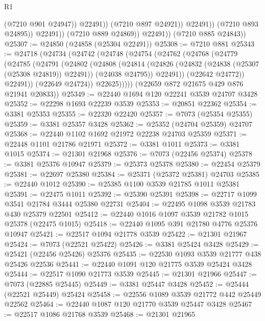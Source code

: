 \begin{lexlean}{R1}
\begin{coremodule}
                              (@7210 @901 @24947))
                            @22491))
                        (@7210 @897 @24921))
                      @22491))
                  (@7210 @893 @24895))
                @22491))
            (@7210 @889 @24869))
          @22491))
      (@7210 @885 @24843))
@25307 := @24850 (@24858 (@25304 @22491))
@25308 := @7210 @881
@25343 := @24718
    (@24734
      (@24742
        (@24748
          (@24754
            (@24762
              (@24768
                (@24779
                  (@24785
                    (@24791
                      (@24802
                        (@24808
                          (@24814
                            (@24826
                              (@24832 (@24838 (@25307 (@25308 @24819)) @22491))
                              (@24038 @24795))
                            @22491))
                        (@22642 @24772))
                      @22491))
                  (@22649 @24724))
                @22625)))))
      (@22659 @872 @21675 @429 @876 @21941 @20833))
@25349 := @22440 @1694 @120 @22241 @3539 @24707 @3428
@25352 := @22298 @1693 @22239 @3539
@25353 := @20851 @22362
@25354 := @3381 @25353
@25355 := @22320 @22420
@25357 := @7073 (@25354 @25355)
@25359 := @3381 @25357 @3428
@25362 := @25352 (@24704 @25359) @24707
@25368 := @22440 @1102 @1692 @21972 @22238 @24703 @25359
@25371 := @22448 @1101 @21786 @21971
@25372 := @3381 @1011
@25373 := @3381 @1015
@25374 := @21301 @21968
@25376 := @7073 (@22456 @25374)
@25378 := @3381 @25376 @10947
@25379 := @25373 @25378
@25380 := @22454 @25379
@25381 := @22697 @25380
@25384 := @25371 (@25372 @25381) @24703
@25385 := @22440 @1012
@25390 := @25385 @1100 @3539 @21785 @1011 @25381
@25391 := @22475 @1011
@25392 := @25390 @25391
@25398 := @22717 @1099 @3541 @21784 @3444 @25380 @22731
@25404 := @22495 @1098 @3539 @21783 @430 @25379 @22501
@25412 := @22440 @1016 @1097 @3539 @21782 @1015 @25378 (@22475 @1015)
@25418 := @22440 @1095 @391 @21780 @4776 @25376 @10947
@25421 := @22517 @1094 @21778 @3539
@25422 := @21301 @21967
@25424 := @7073 (@22521 @25422)
@25426 := @3381 @25424 @3428
@25429 := @25421 (@22456 @25426) @25376
@25435 := @22530 @1093 @3539 @21777 @438 @25426 @22536
@25441 := @22440 @1091 @120 @21775 @3539 @25424 @3428
@25444 := @22517 @1090 @21773 @3539
@25445 := @21301 @21966
@25447 := @7073 (@22885 @25445)
@25449 := @3381 @25447 @3428
@25452 := @25444 (@22521 @25449) @25424
@25458 := @22556 @1089 @3539 @21772 @442 @25449 @22562
@25464 := @22440 @1087 @120 @21770 @3539 @25447 @3428
@25467 := @22517 @1086 @21768 @3539
@25468 := @21301 @21965

\end{coremodule}
\end{lexlean}
